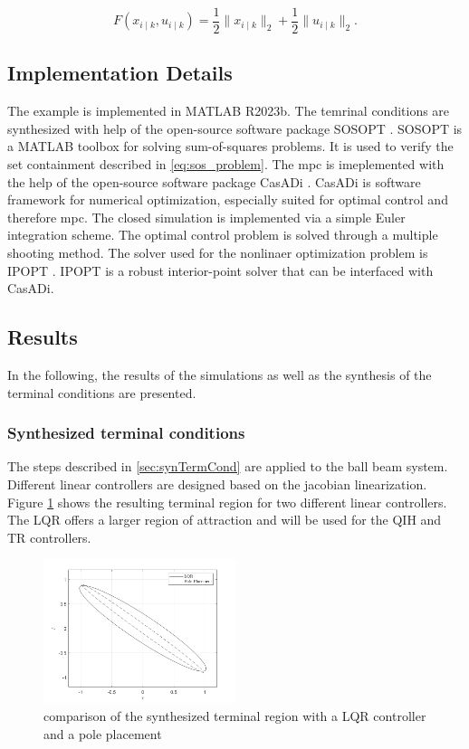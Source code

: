 \documentclass[10pt,a4paper]{article}
\begin{document}
\begin{equation}
	F\left(x_{i \mid k}, u_{i \mid k}\right) = \frac{1}{2} \lVert x_{i \mid k} \rVert_2 + \frac{1}{2} \lVert u_{i \mid k} \rVert_2.
\end{equation}

\subsection{Implementation Details}
The example is implemented in MATLAB R2023b.  The temrinal conditions are synthesized with help of the open-source software package
SOSOPT \cite{seiler2013sosopt}. SOSOPT is a MATLAB toolbox for solving sum-of-squares problems. It is used to verify the set containment
described in \eqref{eq:sos_problem}. The \gls{mpc} is imeplemented with the help of the open-source software package CasADi \cite{Andersson2019}.
CasADi is software framework for numerical optimization, especially suited for optimal control and therefore \gls{mpc}. The closed simulation is implemented
via a simple Euler integration scheme. The optimal control problem is solved through a multiple shooting method. The solver used for the nonlinaer 
optimization problem is IPOPT \cite{Wächter2006}. IPOPT is a robust interior-point solver that can be interfaced with CasADi.


\subsection{Results}
In the following, the results of the simulations as well as the synthesis of the terminal conditions are presented.

\subsubsection*{Synthesized terminal conditions}
The steps described in \ref{sec:synTermCond} are applied to the ball beam system. Different linear controllers are designed based on the jacobian linearization.
Figure \ref{pic:LQRvsPole} shows the resulting terminal region for two different linear controllers. The LQR offers a larger region of attraction and will be used
for the QIH and TR controllers.

\begin{figure}[h]
	\begin{center}
		\includegraphics[width=0.5\textwidth]{img/LQRvsPole.png}
		\caption{comparison of the synthesized terminal region with a LQR controller and a pole placement}
		\label{pic:LQRvsPole}
	\end{center}
\end{figure}
\end{document}
